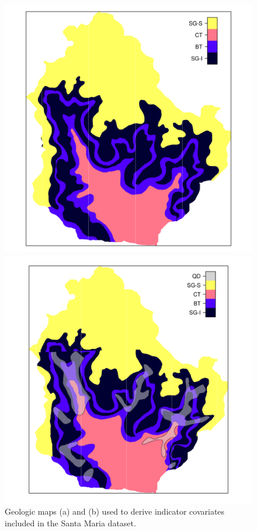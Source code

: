 \begin{figure}[!ht]
\centering
\begin{minipage}[b]{63mm}
\subcaption{}
\centering
\includegraphics{fig/chap05-geo-old}
\end{minipage}
\begin{minipage}[b]{63mm}
\subcaption{}
\centering
\includegraphics{fig/chap05-geo-new}
\end{minipage} 
\caption[Geologic maps included in the Santa Maria dataset.]{Geologic maps (a) \geoOld{} and (b) \geoNew{} 
used 
to derive indicator covariates included in the Santa Maria dataset.}
\label{fig:chap05-geo-maps}
\end{figure}

